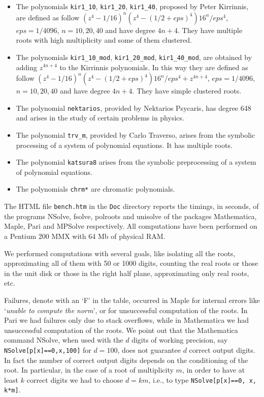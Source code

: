 \documentclass{article}
\begin{document}
\begin{itemize}
\item The polynomials {\tt kir1\_10},  {\tt kir1\_20},  {\tt kir1\_40},
proposed by Peter Kirrinnis, are defined as follow
$ (z^4-1/16)^n(z^4-(1/2+eps)^4)16^n/eps^4$, $eps=1/4096$,
$n=10,20,40$ and have degree $4n+4$. They have multiple roots with
high multiplicity and some of them clustered.


\item The polynomials {\tt kir1\_10\_mod},  {\tt kir1\_20\_mod},  
{\tt kir1\_40\_mod},
are obtained by adding $z^{4n+4}$ to the Kirrinnis polynomials. In this
way they
are defined as follow
$ (z^4-1/16)^n(z^4-(1/2+eps)^4)16^n/eps^4+z^{4n+4}$, $eps=1/4096$,
$n=10,20,40$ and have degree $4n+4$. They have simple clustered roots.

\item The polynomial {\tt nektarios}, provided by Nektarios Psycaris,
has degree 648 and arises in the study of certain problems in physics. 

\item The polynomial {\tt trv\_m}, provided by Carlo Traverso, arises
from
the symbolic processing of a system of polynomial equations. It has
multiple roots.

\item The polynomial {\tt katsura8} arises from the symbolic
preprocessing
of a system of polynomial equations. 

\item The polynomials {\tt chrm*} are chromatic polynomials.
\end{itemize}


The HTML file {\tt bench.htm} in the {\tt Doc} directory reports the timings,
in seconds, of the programs NSolve, fsolve, polroots and unisolve of
the packages Mathematica, Maple, Pari and MPSolve respectively. All
computations have been performed on a Pentium 200 MMX with 64 Mb
of physical RAM.

We performed computations with several goals, like isolating all the
roots, approximating all of them with 50 or 1000 digits, counting the
real roots or those in the unit disk or those in the right half plane,
approximating only real roots, etc.

Failures, denote with an `F' in the table, occurred in Maple for
internal errors like `{\em unable to compute the norm}', or for
unsuccessful computation of the roots. In Pari we had failures only
due to stack overflows, while in Mathematica we had unsuccessful
computation of the roots.  We point out that the Mathematica command
NSolve, when used with the $d$ digits of working precision, say {\tt
NSolve[p[x]==0,x,100]} for $d=100$, does not guarantee $d$ correct
output digits. In fact the number of correct output digits depends on
the conditioning of the root. In particular, in the case of a root of
multiplicity $m$, in order to have at least $k$ correct digits we had
to choose $d=km$, i.e., to type {\tt NSolve[p[x]==0, x, k*m]}.
\end{document}
